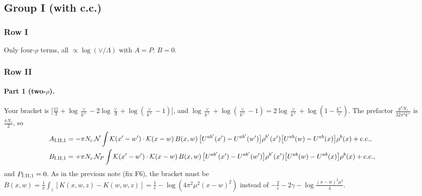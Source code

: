 \documentclass[10pt]{article}
\numberwithin{equation}{section}
\newcommand{\KK}{\mathcal K}
\newcommand{\NN}{\mathcal N}
\newcommand{\NP}{\mathcal N_{P}}
\begin{document}
\subsection{Group I (with c.c.)}
\subsubsection{Row I}
Only four-$\rho$ terms, all $\propto\log(\vee/\Lambda)$ with $A=P$: \textbf{$B=0$}.

\subsubsection{Row II}\label{sec:I.II}
\paragraph{Part 1 (two-$\rho$).} Your bracket is $\big[\frac{11}{3}+\log\frac{\vee}{k^+}-2\log\frac{\vee}{\Lambda}+\log(\frac{\vee}{k^+}-1)\big]$, and $\log\frac{\vee}{k^+}+\log(\frac{\vee}{k^+}-1)=2\log\frac{\vee}{k^+}+\log(1-\frac{k^+}{\vee})$. The prefactor $\frac{g^4N_c}{32\pi^4k^+}$ is $\frac{\pi N_c}{2}$, so
\begin{align}
A_{\rm I.II,1}&=-\pi N_c\,\NN\int\KK(x'-w')\cdot\KK(x-w)\,B(x,w)\,\big[U^{ab'}(x')-U^{ab'}(w')\big]\rho^{b'}(x')\big[U^{ab}(w)-U^{ab}(x)\big]\rho^b(x)+{\rm c.c.},\notag\\
B_{\rm I.II,1}&=+\pi N_c\,\NP\int\KK(x'-w')\cdot\KK(x-w)\,B(x,w)\,\big[U^{ab'}(x')-U^{ab'}(w')\big]\rho^{b'}(x')\big[U^{ab}(w)-U^{ab}(x)\big]\rho^b(x)+{\rm c.c.},
\end{align}
and $P_{\rm I.II,1}=0$. As in the previous note (fix F6), the bracket must be $B(x,w)=\frac1\pi\int_z[K(x,w,z)-K(w,w,z)]=\frac1{\bar\epsilon}-\log(4\pi^2\mu^2(x-w)^2)$ instead of $-\frac2\epsilon-2\gamma-\log\frac{(x-w)^2\mu^2}{4}$.
\end{document}
